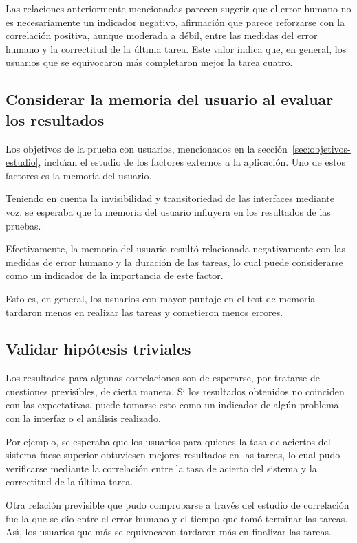 Las relaciones anteriormente mencionadas parecen sugerir que el error humano no es necesariamente
un indicador negativo, afirmaci\'on que parece reforzarse con la correlaci\'on positiva, aunque moderada
a d\'ebil, entre las medidas del error humano y la correctitud de la \'ultima tarea. Este valor
indica que, en general, los usuarios que se equivocaron m\'as completaron mejor la tarea cuatro.

\subsection[Considerar la memoria del usuario al evaluar los resultados]
{Considerar la memoria del usuario al evaluar los resultados}
Los objetivos de la prueba con usuarios, mencionados en la secci\'on~\ref{sec:objetivos-estudio},
inclu{\'\i}an el estudio de los factores externos a la aplicaci\'on. Uno de estos factores
es la memoria del usuario.

Teniendo en cuenta la invisibilidad y transitoriedad de las interfaces mediante
voz, se esperaba que la memoria del usuario influyera en los resultados de
las pruebas.

Efectivamente, la memoria del usuario result\'o relacionada negativamente con las medidas 
de error humano y la duraci\'on de las tareas, lo cual puede considerarse como un indicador de 
la importancia de este factor.

Esto es, en general, los usuarios con mayor puntaje en el test de memoria
tardaron menos en realizar las tareas y cometieron menos errores.

\subsection[Validar hip\'otesis triviales]
{Validar hip\'otesis triviales}

Los resultados para algunas correlaciones son de esperarse, por tratarse de cuestiones
previsibles, de cierta manera. Si los resultados obtenidos no coinciden con las expectativas,
puede tomarse esto como un indicador de alg\'un problema con la interfaz o el an\'alisis realizado. 

Por ejemplo, se esperaba que los usuarios para quienes la tasa de aciertos del sistema fuese superior
obtuviesen mejores resultados en las tareas, lo cual pudo verificarse mediante la correlaci\'on 
entre la tasa de acierto del sistema y la correctitud de la \'ultima tarea.

Otra relaci\'on previsible que pudo comprobarse a trav\'es del estudio de correlaci\'on fue la que
se dio entre el error humano y el tiempo que tom\'o terminar las tareas. As{{\'\i}}, los usuarios que
m\'as se equivocaron tardaron m\'as en finalizar las tareas.

